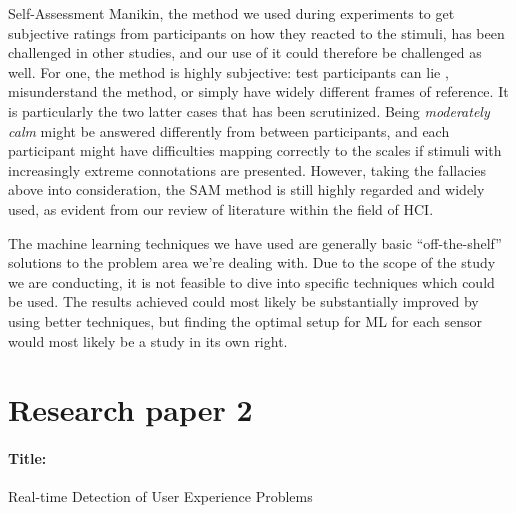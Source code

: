 Self-Assessment Manikin, the method we used during experiments to get subjective
ratings from participants on how they reacted to the stimuli, has been
challenged in other studies, and our use of it could therefore be challenged as
well. For one, the method is highly subjective: test participants can lie ,
misunderstand the method, or simply have widely different frames of
reference. It is particularly the two latter cases that has been
scrutinized. Being \textit{moderately calm} might be answered differently from
between participants, and each participant might have difficulties mapping
correctly to the scales if stimuli with increasingly extreme connotations are
presented. However, taking the fallacies above into consideration, the SAM
method is still highly regarded and widely used, as evident from our review of
literature within the field of HCI. 

The machine learning techniques we have used are generally basic ``off-the-shelf'' solutions to the problem area we're dealing with.
Due to the scope of the study we are conducting, it is not feasible to dive into specific techniques which could be used. 
The results achieved could most likely be substantially improved by using better techniques, but finding the optimal setup for ML for each sensor would most likely be a study in its own right.


\section{Research paper 2}
\paragraph{Title:}
Real-time Detection of User Experience Problems
